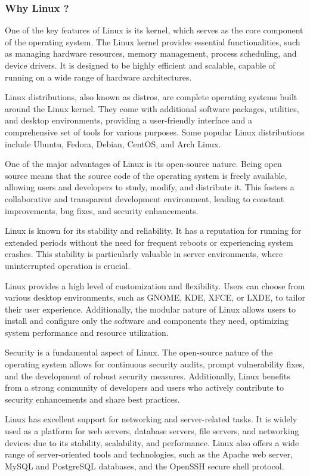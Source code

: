 \documentclass[
12pt,
oneside, 
onehalfspacing, 
nolistspacing, 
parskip, 
chapterinoneline, 
]{AASTCOMPUTER}
\begin{document}
\subsubsection{Why Linux ?}
One of the key features of Linux is its kernel, which serves as the core component of the operating system. The Linux kernel provides essential functionalities, such as managing hardware resources, memory management, process scheduling, and device drivers. It is designed to be highly efficient and scalable, capable of running on a wide range of hardware architectures.

Linux distributions, also known as distros, are complete operating systems built around the Linux kernel. They come with additional software packages, utilities, and desktop environments, providing a user-friendly interface and a comprehensive set of tools for various purposes. Some popular Linux distributions include Ubuntu, Fedora, Debian, CentOS, and Arch Linux.

One of the major advantages of Linux is its open-source nature. Being open source means that the source code of the operating system is freely available, allowing users and developers to study, modify, and distribute it. This fosters a collaborative and transparent development environment, leading to constant improvements, bug fixes, and security enhancements.

Linux is known for its stability and reliability. It has a reputation for running for extended periods without the need for frequent reboots or experiencing system crashes. This stability is particularly valuable in server environments, where uninterrupted operation is crucial.

Linux provides a high level of customization and flexibility. Users can choose from various desktop environments, such as GNOME, KDE, XFCE, or LXDE, to tailor their user experience. Additionally, the modular nature of Linux allows users to install and configure only the software and components they need, optimizing system performance and resource utilization.

Security is a fundamental aspect of Linux. The open-source nature of the operating system allows for continuous security audits, prompt vulnerability fixes, and the development of robust security measures. Additionally, Linux benefits from a strong community of developers and users who actively contribute to security enhancements and share best practices.

Linux has excellent support for networking and server-related tasks. It is widely used as a platform for web servers, database servers, file servers, and networking devices due to its stability, scalability, and performance. Linux also offers a wide range of server-oriented tools and technologies, such as the Apache web server, MySQL and PostgreSQL databases, and the OpenSSH secure shell protocol.
\end{document}
